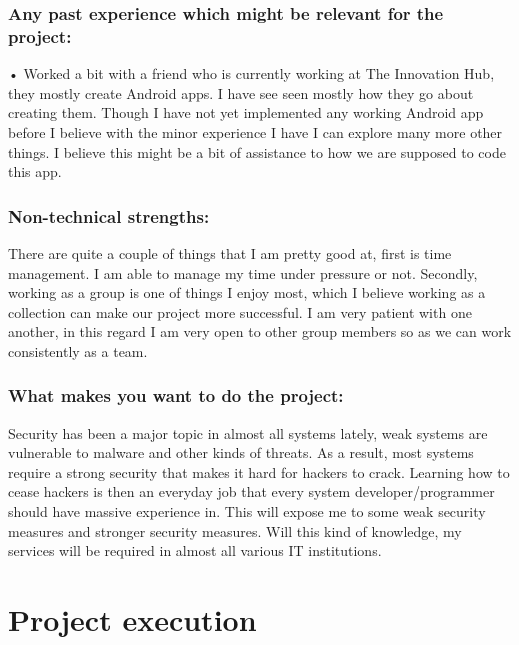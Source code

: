 \documentclass[12pt]{article}
\begin{document}
\begin{description}
	\subsubsection{Any past experience which might be relevant for the project:}
	
	• Worked a bit with a friend who is currently working at The Innovation Hub, they mostly create Android apps. I have see seen mostly how they go about creating them. Though I have not yet implemented any working Android app before I believe with the minor experience I have I can explore many more other things. I believe this might be a bit of assistance to how we are supposed to code this app.
	
	\subsubsection{Non-technical strengths:}
	
	There are quite a couple of things that I am pretty good at, first is time management. I am able to manage my time under pressure or not. Secondly, working as a group is one of things I enjoy most, which I believe working as a collection can make our project more successful. I am very patient with one another, in this regard I am very open to other group members so as we can work consistently as a team.
	
	\subsubsection{What makes you want to do the project:}
	
	Security has been a major topic in almost all systems lately, weak systems are vulnerable to malware and other kinds of threats. As a result, most systems require a strong security that makes it hard for hackers to crack. Learning how to cease hackers is then an everyday job that every system developer/programmer should have massive experience in. This will expose me to some weak security measures and stronger security measures. Will this kind of knowledge, my services will be required in almost all various IT institutions.
	
	
	\end{description}
	

\section{Project execution}
\end{document}
